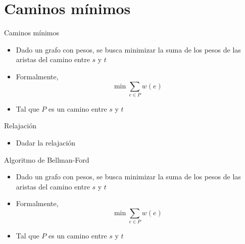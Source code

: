 \documentclass[]{beamer}
\begin{document}
\section{Caminos m\'inimos}
\begin{frame}{Caminos m\'inimos}
  \begin{itemize}
    \item Dado un grafo con pesos, se busca minimizar la suma de los pesos de las aristas del camino entre $s$ y $t$
      \pause
    \item Formalmente, $$ \min \sum_{e \in P} w(e)$$
      \pause
    \item Tal que $P$ es un camino entre $s$ y $t$
  \end{itemize}
\end{frame}

\begin{frame}{Relajaci\'on}
  \begin{itemize}
    \item Dadar la relajaci\'on
  \end{itemize}
\end{frame}

\begin{frame}{Algoritmo de Bellman-Ford}
  \begin{itemize}
    \item Dado un grafo con pesos, se busca minimizar la suma de los pesos de las aristas del camino entre $s$ y $t$
      \pause
    \item Formalmente, $$ \min \sum_{e \in P} w(e)$$
      \pause
    \item Tal que $P$ es un camino entre $s$ y $t$
  \end{itemize}
\end{frame}
\end{document}
